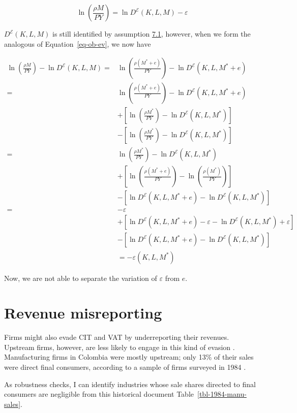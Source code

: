 \documentclass[
  12pt]{article}
\theoremstyle{definition}
\theoremstyle{remark}
\begin{document}
\[
\ln\left(\frac{\rho M}{PY}\right)=\ln D^{\mathcal{E}}(K,L,M)-\varepsilon
\]

\(D^{\mathcal{E}}(K,L,M)\) is still identified by assumption
\hyperref[ass-non-ev]{7.1}, however, when we form the analogous of
Equation~\ref{eq-ob-ev}, we now have

\[
\begin{aligned}
\ln\left(\frac{\rho M}{PY}\right)-\ln D^{\mathcal{E}}(K,L,M)=&\ln\left(\frac{\rho(M^*+e)}{PY}\right)-\ln D^{\mathcal{E}}(K,L,M^*+e)\\
=&\ln\left(\frac{\rho(M^*+e)}{PY}\right)-\ln D^{\mathcal{E}}(K,L,M^*+e)\\
&+\left[\ln\left(\frac{\rho M^*}{PY}\right)-\ln D^{\mathcal{E}}(K,L,M^*)\right]\\
&-\left[\ln\left(\frac{\rho M^*}{PY}\right)-\ln D^{\mathcal{E}}(K,L,M^*)\right] \\
=&\ln\left(\frac{\rho M^*}{PY}\right)-\ln D^{\mathcal{E}}(K,L,M^*) \\
&+\left[\ln\left(\frac{\rho(M^*+e)}{PY}\right)-\ln\left(\frac{\rho(M^*)}{PY}\right)\right]\\
&-\left[\ln D^{\mathcal{E}}(K,L,M^*+e)-\ln D^{\mathcal{E}}(K,L,M^*)\right]\\
=& -\varepsilon \\
&+\left[\ln D^{\mathcal{E}}(K,L,M^*+e)-\varepsilon-\ln D^{\mathcal{E}}(K,L,M^*)+\varepsilon\right]\\
&-\left[\ln D^{\mathcal{E}}(K,L,M^*+e)-\ln D^{\mathcal{E}}(K,L,M^*)\right]\\
&= -\varepsilon(K,L,M^*)
\end{aligned}
\]

Now, we are not able to separate the variation of \(\varepsilon\) from
\(e\).

\section{Revenue misreporting}\label{revenue-misreporting}

Firms might also evade CIT and VAT by underreporting their revenues.
Upstream firms, however, are less likely to engage in this kind of
evasion \citep{Almunia2018}. Manufacturing firms in Colombia were mostly
upstream; only 13\% of their sales were direct final consumers,
according to a sample of firms surveyed in 1984 \citep{Perry1990}.

As robustness checks, I can identify industries whose sale shares
directed to final consumers are negligible from this historical document
Table~\ref{tbl-1984-manu-sales}.
\end{document}
